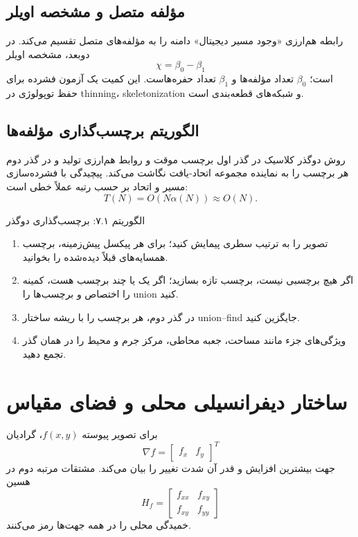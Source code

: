 \documentclass[12pt,openany,oneside]{book}
\begin{document}
\subsection{مؤلفه متصل و مشخصه اویلر}
رابطه هم‌ارزی «وجود مسیر دیجیتال» دامنه را به مؤلفه‌های متصل تقسیم می‌کند. در دوبعد، مشخصه اویلر
\begin{equation}
\chi=\beta_0-\beta_1
\end{equation}
است؛ \(\beta_0\) تعداد مؤلفه‌ها و \(\beta_1\) تعداد حفره‌هاست. این کمیت یک آزمون فشرده برای حفظ توپولوژی
در thinning، skeletonization و شبکه‌های قطعه‌بندی است.

\subsection{الگوریتم برچسب‌گذاری مؤلفه‌ها}
روش دوگذر کلاسیک در گذر اول برچسب موقت و روابط هم‌ارزی تولید و در گذر دوم هر برچسب را به نماینده مجموعه
اتحاد-یافت نگاشت می‌کند. پیچیدگی با فشرده‌سازی مسیر و اتحاد بر حسب رتبه عملاً خطی است:
\begin{equation}
T(N)=O(N\alpha(N))\approx O(N).
\end{equation}

\begin{algorithmbox}{الگوریتم ۷.۱: برچسب‌گذاری دوگذر}
\begin{enumerate}
\item تصویر را به ترتیب سطری پیمایش کنید؛ برای هر پیکسل پیش‌زمینه، برچسب همسایه‌های قبلاً دیده‌شده را بخوانید.
\item اگر هیچ برچسبی نیست، برچسب تازه بسازید؛ اگر یک یا چند برچسب هست، کمینه را اختصاص و برچسب‌ها را union کنید.
\item در گذر دوم، هر برچسب را با ریشه ساختار union--find جایگزین کنید.
\item ویژگی‌های جزء مانند مساحت، جعبه محاطی، مرکز جرم و محیط را در همان گذر تجمع دهید.
\end{enumerate}
\end{algorithmbox}

\section{ساختار دیفرانسیلی محلی و فضای مقیاس}
برای تصویر پیوسته \(f(x,y)\)، گرادیان
\begin{equation}
\nabla f=\begin{bmatrix}f_x&f_y\end{bmatrix}^{\!T}
\end{equation}
جهت بیشترین افزایش و قدر آن شدت تغییر را بیان می‌کند. مشتقات مرتبه دوم در هسین
\begin{equation}
H_f=\begin{bmatrix}f_{xx}&f_{xy}\\ f_{xy}&f_{yy}\end{bmatrix}
\end{equation}
خمیدگی محلی را در همه جهت‌ها رمز می‌کنند.
\end{document}
